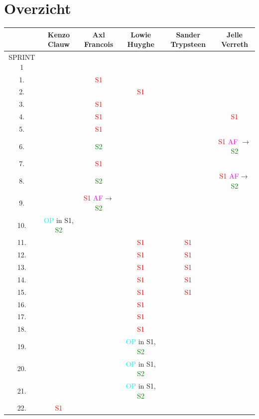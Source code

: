 \documentclass[pdftex,a4paper,12pt,twoside]{report}
\begin{document}
\section{Overzicht}

\begin{tabular}{|c|c|c|c|c|c|}
\hline  & Kenzo Clauw & Axl Francois & Lowie Huyghe & Sander Trypsteen & Jelle Verreth \\ 
\hline SPRINT 1 &  &  &  &  &  \\
\hline 1. &  & \textcolor{red}{S1} &  &  &  \\ 
\hline 2. &  &  & \textcolor{red}{S1}  &  &  \\ 
\hline 3.  &  & \textcolor{red}{S1} &  &  &  \\
\hline 4.  &  & \textcolor{red}{S1} &  &  & \textcolor{red}{S1}  \\
\hline 5.  &  & \textcolor{red}{S1} &  &  &  \\
\hline 6.  &  &\textcolor{green}{S2}   &  &  &\textcolor{red}{S1}  \textcolor{magenta}{AF} $\rightarrow$ \textcolor{green}{S2}  \\
\hline 7.  &  & \textcolor{red}{S1} &  &  &  \\
\hline 8.  &  & \textcolor{green}{S2}   &  &  & \textcolor{red}{S1} \textcolor{magenta}{AF}$\rightarrow$ \textcolor{green}{S2}  \\
\hline 9.  &  & \textcolor{red}{S1}  \textcolor{magenta}{AF}$\rightarrow$ \textcolor{green}{S2}   &  &  &  \\
\hline 10. & \textcolor{cyan}{OP} in S1, \textcolor{green}{S2} & & &  &  \\
\hline 11. &  &  & \textcolor{red}{S1} & \textcolor{red}{S1}  &  \\ 
\hline 12. &  &  &\textcolor{red}{S1}  & \textcolor{red}{S1} &  \\ 
\hline 13.  &  &  & \textcolor{red}{S1} & \textcolor{red}{S1}  &  \\
\hline 14.  &  &  & \textcolor{red}{S1} & \textcolor{red}{S1} &  \\
\hline 15.  &  &  & \textcolor{red}{S1} & \textcolor{red}{S1} &  \\
\hline 16.  &  &  &  \textcolor{red}{S1}&  &  \\
\hline 17.  &  &  & \textcolor{red}{S1} &  &  \\
\hline 18.  &  &  & \textcolor{red}{S1} &  &  \\
\hline 19. &  & &\textcolor{cyan}{OP} in S1, \textcolor{green}{S2} &  &  \\
\hline 20.&  & & \textcolor{cyan}{OP} in S1, \textcolor{green}{S2}&  &  \\
\hline 21.& & & \textcolor{cyan}{OP} in S1, \textcolor{green}{S2} &  &  \\
\hline 22. & \textcolor{red}{S1}  &  &  &  &  \\
\hline
\end{tabular}
\end{document}
